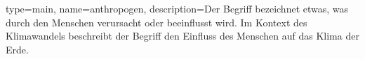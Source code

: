 {
	type=main,
	name=anthropogen,
	description={Der Begriff bezeichnet etwas, was durch den Menschen verursacht oder beeinflusst wird. Im Kontext des Klimawandels beschreibt der Begriff den Einfluss des Menschen auf das Klima der Erde.}
}
